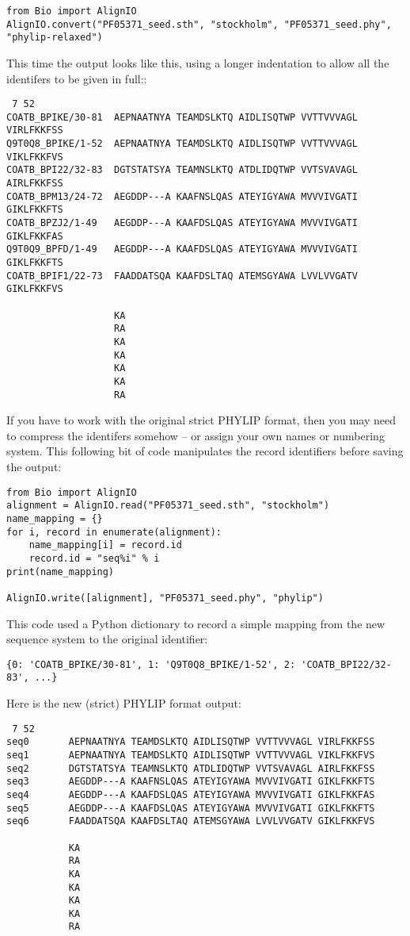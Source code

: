 \documentclass{report}
\begin{document}
\begin{verbatim}
from Bio import AlignIO
AlignIO.convert("PF05371_seed.sth", "stockholm", "PF05371_seed.phy", "phylip-relaxed")
\end{verbatim}

This time the output looks like this, using a longer indentation to
allow all the identifers to be given in full::

\begin{verbatim}
 7 52
COATB_BPIKE/30-81  AEPNAATNYA TEAMDSLKTQ AIDLISQTWP VVTTVVVAGL VIRLFKKFSS
Q9T0Q8_BPIKE/1-52  AEPNAATNYA TEAMDSLKTQ AIDLISQTWP VVTTVVVAGL VIKLFKKFVS
COATB_BPI22/32-83  DGTSTATSYA TEAMNSLKTQ ATDLIDQTWP VVTSVAVAGL AIRLFKKFSS
COATB_BPM13/24-72  AEGDDP---A KAAFNSLQAS ATEYIGYAWA MVVVIVGATI GIKLFKKFTS
COATB_BPZJ2/1-49   AEGDDP---A KAAFDSLQAS ATEYIGYAWA MVVVIVGATI GIKLFKKFAS
Q9T0Q9_BPFD/1-49   AEGDDP---A KAAFDSLQAS ATEYIGYAWA MVVVIVGATI GIKLFKKFTS
COATB_BPIF1/22-73  FAADDATSQA KAAFDSLTAQ ATEMSGYAWA LVVLVVGATV GIKLFKKFVS

                   KA
                   RA
                   KA
                   KA
                   KA
                   KA
                   RA
\end{verbatim}

If you have to work with the original strict PHYLIP format, then you may need to
compress the identifers somehow -- or assign your own names or numbering system.
This following bit of code manipulates the record identifiers before saving the output:

\begin{verbatim}
from Bio import AlignIO
alignment = AlignIO.read("PF05371_seed.sth", "stockholm")
name_mapping = {}
for i, record in enumerate(alignment):
    name_mapping[i] = record.id
    record.id = "seq%i" % i
print(name_mapping)

AlignIO.write([alignment], "PF05371_seed.phy", "phylip")
\end{verbatim}

\noindent This code used a Python dictionary to record a simple mapping from the new sequence system to the original identifier:
\begin{verbatim}
{0: 'COATB_BPIKE/30-81', 1: 'Q9T0Q8_BPIKE/1-52', 2: 'COATB_BPI22/32-83', ...}
\end{verbatim}

\noindent Here is the new (strict) PHYLIP format output:
\begin{verbatim}
 7 52
seq0       AEPNAATNYA TEAMDSLKTQ AIDLISQTWP VVTTVVVAGL VIRLFKKFSS
seq1       AEPNAATNYA TEAMDSLKTQ AIDLISQTWP VVTTVVVAGL VIKLFKKFVS
seq2       DGTSTATSYA TEAMNSLKTQ ATDLIDQTWP VVTSVAVAGL AIRLFKKFSS
seq3       AEGDDP---A KAAFNSLQAS ATEYIGYAWA MVVVIVGATI GIKLFKKFTS
seq4       AEGDDP---A KAAFDSLQAS ATEYIGYAWA MVVVIVGATI GIKLFKKFAS
seq5       AEGDDP---A KAAFDSLQAS ATEYIGYAWA MVVVIVGATI GIKLFKKFTS
seq6       FAADDATSQA KAAFDSLTAQ ATEMSGYAWA LVVLVVGATV GIKLFKKFVS

           KA
           RA
           KA
           KA
           KA
           KA
           RA
\end{verbatim}
\end{document}
